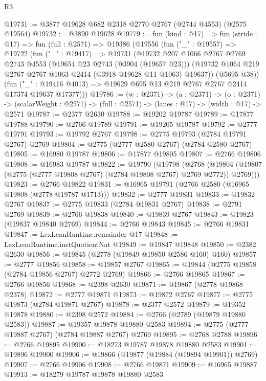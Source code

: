 \begin{lexlean}{R3}
\begin{coremodule}
@19731 := @3877 @19628 @682 @2318 @2770 @2767 (@2744 @4553) (@2575 @19564)
@19732 := @3890 @19628
@19779 := fun (kind : @17) =>
  fun (stride : @17) =>
  fun (full : @2571) =>
  @19386
    (@19556
      (fun ("_" : @19557) =>
      @19722
        (fun ("_" : @19417) =>
        @19731
          (@19732
            @207
            @1066
            @2767
            @2769
            @2743
            @4553
            (@19654 @23 @2743 (@3904 (@19657 @23)))
            (@19732 @1064 @219 @2767 @2767 @1063 @2414 (@3918 @19628 @11 @1063) @19637))
          (@5695 @38))
        (fun ("_" : @19416 @4013) => @19629 @695 @13 @219 @2767 @2767 @2414 @17374 @19637 @17377)))
@19786 := (w : @2371) ->
  (a : @2371) ->
  (o : @2371) -> (scalarWeight : @2571) -> (full : @2571) -> (lanes : @17) -> (width : @17) -> @2571
@19787 := @2377 @2630
@19788 := @19202 @19787
@19789 := @17877 @19788
@19790 := @2766 @19789
@19791 := @19205 @19787
@19792 := @2777 @19791
@19793 := @19792 @2767
@19798 := @2775 @19793 (@2784 @19791 @2767) @2769
@19804 := @2775 (@2777 @2580 @2767) (@2784 @2580 @2767)
@19805 := @16980 @19787
@19806 := @17877 @19805
@19807 := @2766 @19806
@19808 := @16983 @19787
@19822 := @19790
    (@19798
      (@2768 (@19804 (@19807 (@2775 (@2777 @19808 @2767) (@2784 @19808 @2767) @2769 @2772)) @2769)))
@19823 := @2766 @19822
@19831 := @16965 @19791 (@2766 @2580 (@16965 @19808 (@2778 @19787 @1713)))
@19832 := @2777 @19831
@19833 := @19832 @2767
@19837 := @2775 @19833 (@2784 @19831 @2767)
@19838 := @2791 @2769
@19839 := @2766 @19838
@19840 := @19839 @2767
@19843 := @19823 (@19837 @19840 @2769)
@19844 := @2766 @19843
@19845 := @2766 @19831
@19847 := LexLeanRuntime.remainder @17
@19848 := LexLeanRuntime.instQuotientNat
@19849 := @19847 @19848
@19850 := @2382 @2630
@19856 := @19845 (@2778 (@19849 @19850 @2586 @160) @160)
@19857 := @2777 @19856
@19858 := @19857 @2767
@19865 := @19844 (@2775 @19858 (@2784 @19856 @2767) @2772 @2769)
@19866 := @2766 @19865
@19867 := @2766 @19856
@19868 := @2398 @2630
@19871 := @19867 (@2778 @19868 @2378)
@19872 := @2777 @19871
@19873 := @19872 @2767
@19877 := @2775 @19873 (@2784 @19871 @2767)
@19878 := @2377 @2572
@19879 := @19352 @19878
@19880 := @2398 @2572
@19884 := @2766 (@2789 (@19879 @19880 @2583))
@19887 := @19357 @19878 @19880 @2583
@19894 := @2775 (@2777 @19887 @2767) (@2784 @19887 @2767) @2769
@19895 := @2768 @2788
@19896 := @2766 @19895
@19900 := @18273 @19787 @19878 @19880 @2583
@19901 := @19896 @19900
@19906 := @19866 (@19877 (@19884 (@19894 @19901)) @2769)
@19907 := @2766 @19906
@19908 := @2766 @19871
@19909 := @16965 @19887
@19913 := @18279 @19787 @19878 @19880 @2583

\end{coremodule}
\end{lexlean}

